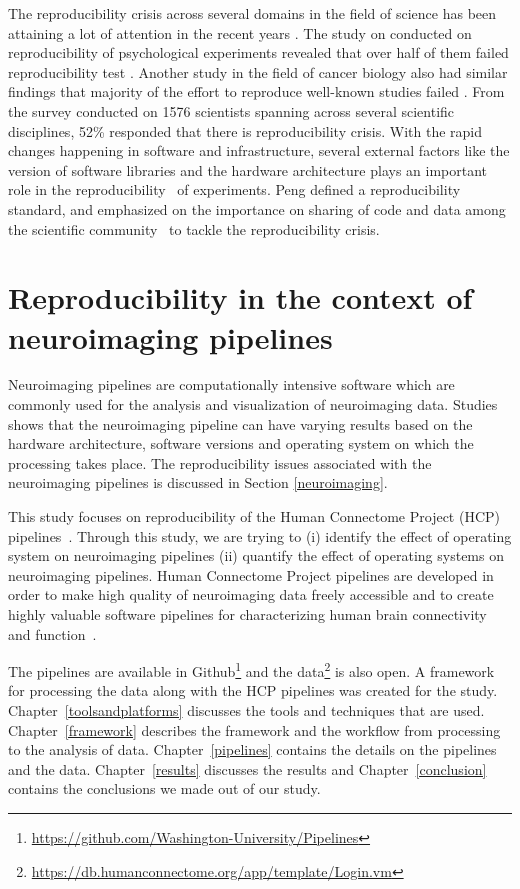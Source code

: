 The reproducibility crisis across several domains in the field of science has been attaining a lot of attention in the recent years \cite{aac4716,Begley2012,Button2013,Baker2016,Estimating-reproducibility,Gla15}. The study on conducted on reproducibility of psychological experiments revealed that over half of them failed reproducibility test \cite{aac4716}. Another study in the field of cancer biology also had similar findings that majority of the effort to reproduce well-known studies failed \cite{Begley2012}. From the survey conducted on 1576 scientists spanning across several scientific disciplines, 52\% responded that there is reproducibility crisis.
With the rapid changes happening in software and infrastructure, several external factors like the version of software libraries and the hardware architecture plays an important role in the reproducibility~\cite{10.1371/journal.pone.0038234,Gla15} of experiments. Peng defined a reproducibility standard, and emphasized on the importance on sharing of code and data among the scientific community~\cite{Peng2011} to tackle the reproducibility  crisis.

\section{Reproducibility in the context of neuroimaging pipelines}
Neuroimaging pipelines are computationally intensive software which are commonly used for the analysis and visualization of neuroimaging data. Studies~\cite{10.1371/journal.pone.0038234,Gla15} shows that the neuroimaging pipeline can have varying results based on the hardware architecture, software versions and operating system on which the processing takes place. The reproducibility issues associated with the neuroimaging pipelines is discussed in Section \ref{neuroimaging}.

This study focuses on reproducibility of the Human Connectome Project (HCP) pipelines~\cite{Gla13}. Through this study, we are trying to (i) identify the effect of operating system on neuroimaging pipelines (ii) quantify the effect of operating systems on neuroimaging pipelines. Human Connectome Project pipelines are developed in order to make high quality of neuroimaging data freely accessible and to create highly valuable software pipelines for characterizing human brain connectivity and function~\cite{VanEssen2013}.

The pipelines are available in Github\footnote{\url{https://github.com/Washington-University/Pipelines}} and the data\footnote{\url{https://db.humanconnectome.org/app/template/Login.vm}} is also open. A framework for processing the data along with the HCP pipelines was created for the study. Chapter~\ref{toolsandplatforms} discusses the tools and techniques that are used. Chapter~\ref{framework} describes the framework and the workflow from processing to the analysis of data. Chapter~\ref{pipelines} contains the details on the pipelines and the data. Chapter~\ref{results} discusses the results and Chapter~\ref{conclusion} contains the conclusions we made out of our study.

